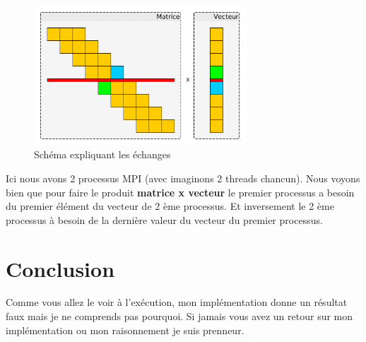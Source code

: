 \documentclass[11pt]{article}
\begin{document}
\begin{figure}[htbp]
\centering
\includegraphics[width=300px]{../ressources/matrice_vecteur.png}
\caption{\label{fig:org0fe142b}Schéma expliquant les échanges}
\end{figure}

Ici nous avons 2 processus MPI (avec imaginons 2 threads chancun). Nous voyons
bien que pour faire le produit \textbf{matrice x vecteur} le premier processus a
besoin du premier élément du vecteur de 2 ème processus. Et inversement le 2
ème processus à besoin de la dernière valeur du vecteur du premier processus.

\section{Conclusion}
\label{sec:org23769c0}

Comme vous allez le voir à l'exécution, mon implémentation donne un résultat
faux mais je ne comprends pas pourquoi. Si jamais vous avez un retour sur mon
implémentation ou mon raisonnement je suis prenneur.
\end{document}
